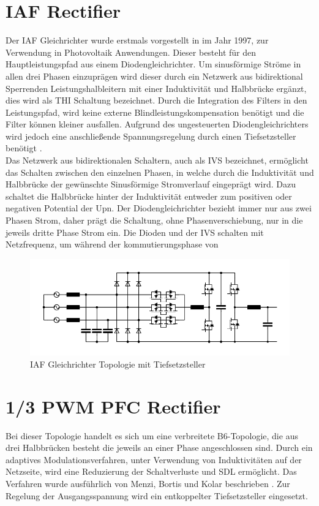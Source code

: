 \section{IAF Rectifier }
	Der \gls{IAF} Gleichrichter wurde erstmals vorgestellt in \cite{IAFfirst} im Jahr 1997, zur Verwendung in Photovoltaik Anwendungen. Dieser besteht für den Hauptleistungspfad aus einem Diodengleichrichter. Um sinusförmige Ströme in allen drei Phasen einzuprägen wird dieser durch ein Netzwerk aus bidirektional Sperrenden Leistungshalbleitern mit einer Induktivität und Halbbrücke ergänzt, dies wird als \gls{THI} Schaltung bezeichnet. Durch die Integration des Filters in den Leistungspfad, wird keine externe Blindleistungskompensation benötigt und die Filter können kleiner ausfallen. Aufgrund des ungesteuerten Diodengleichrichters wird jedoch eine anschließende Spannungsregelung durch einen Tiefsetzsteller benötigt \cite{ThesisSchrittwieserBuckTypePFC_2017}.\\
	Das Netzwerk aus bidirektionalen Schaltern, auch als \gls{IVS} bezeichnet, ermöglicht das Schalten zwischen den einzelnen Phasen, in welche durch die Induktivität und Halbbrücke der gewünschte Sinusförmige Stromverlauf eingeprägt wird. Dazu schaltet die Halbbrücke hinter der Induktivität entweder zum positiven oder negativen Potential der \gls{Upn}. Der Diodengleichrichter bezieht immer nur aus zwei Phasen Strom, daher prägt die Schaltung, ohne Phasenverschiebung, nur in die jeweils dritte Phase Strom ein. Die Dioden und der \gls{IVS} schalten mit Netzfrequenz, um während der kommutierungsphase von 
	\begin{figure}
		\centering
		\includegraphics[width=0.9\linewidth]{content/Grafiken/IAF}
		\caption[\gls{IAF} Gleichrichter Topologie]{\gls{IAF} Gleichrichter Topologie mit Tiefsetzsteller}
		\label{fig:iaf}
	\end{figure}


\section{1/3 PWM PFC Rectifier}
	\label{sec:GrundlagenB6}
	Bei dieser Topologie handelt es sich um eine verbreitete B6-Topologie, die aus drei Halbbrücken besteht die jeweils an einer Phase angeschlossen sind. Durch ein adaptives Modulationsverfahren, unter Verwendung von Induktivitäten auf der Netzseite, wird eine Reduzierung der Schaltverluste und \gls{SDL} ermöglicht. Das Verfahren wurde ausführlich von Menzi, Bortis und Kolar beschrieben \cite{13PWMPFC}. Zur Regelung der Ausgangsspannung wird ein entkoppelter Tiefsetzsteller eingesetzt.\\
	
